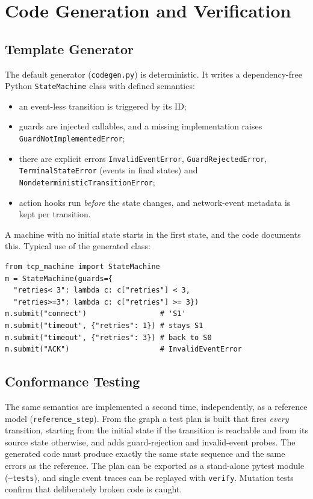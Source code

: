 \documentclass[journal,10pt]{IEEEtran}
\newcommand{\code}[1]{\texttt{#1}}
\begin{document}
\section{Code Generation and Verification}
\label{sec:codegen}

\subsection{Template Generator}
The default generator (\code{codegen.py}) is deterministic. It writes a dependency-free
Python \code{StateMachine} class with defined semantics:
\begin{itemize}
\item an event-less transition is triggered by its ID;
\item guards are injected callables, and a missing implementation raises
\code{GuardNotImplementedError};
\item there are explicit errors \code{InvalidEventError}, \code{GuardRejectedError},
\code{TerminalStateError} (events in final states) and
\code{NondeterministicTransitionError};
\item action hooks run \emph{before} the state changes, and network-event metadata is kept
per transition.
\end{itemize}
A machine with no initial state starts in the first state, and the code documents this.
Typical use of the generated class:

{\footnotesize
\begin{verbatim}
from tcp_machine import StateMachine
m = StateMachine(guards={
  "retries< 3": lambda c: c["retries"] < 3,
  "retries>=3": lambda c: c["retries"] >= 3})
m.submit("connect")                 # 'S1'
m.submit("timeout", {"retries": 1}) # stays S1
m.submit("timeout", {"retries": 3}) # back to S0
m.submit("ACK")                     # InvalidEventError
\end{verbatim}
}

\subsection{Conformance Testing}
The same semantics are implemented a second time, independently, as a reference model
(\code{reference\_step}). From the graph a test plan is built that fires \emph{every}
transition, starting from the initial state if the transition is reachable and from its
source state otherwise, and adds guard-rejection and invalid-event probes. The generated
code must produce exactly the same state sequence and the same errors as the reference.
The plan can be exported as a stand-alone pytest module (\code{--tests}), and single event
traces can be replayed with \code{verify}. Mutation tests confirm that deliberately broken
code is caught.
\end{document}
